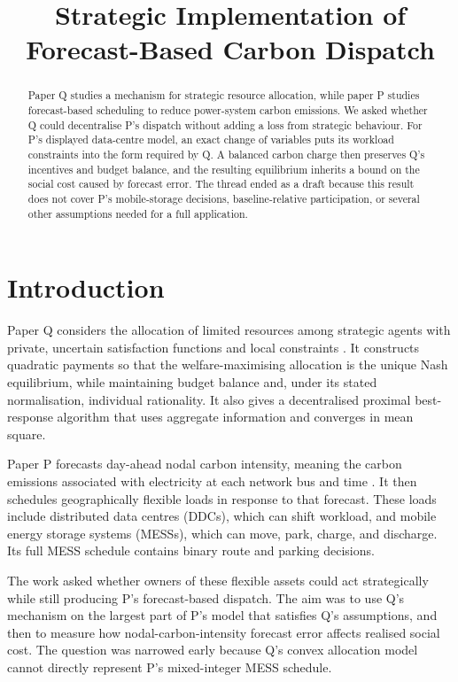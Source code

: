 \documentclass{article}
\title{Strategic Implementation of Forecast-Based Carbon Dispatch}
\author{}
\date{}
\begin{document}
\maketitle

\begin{abstract}
Paper Q studies a mechanism for strategic resource allocation, while paper P studies forecast-based scheduling to reduce power-system carbon emissions.  We asked whether Q could decentralise P's dispatch without adding a loss from strategic behaviour.  For P's displayed data-centre model, an exact change of variables puts its workload constraints into the form required by Q.  A balanced carbon charge then preserves Q's incentives and budget balance, and the resulting equilibrium inherits a bound on the social cost caused by forecast error.  The thread ended as a draft because this result does not cover P's mobile-storage decisions, baseline-relative participation, or several other assumptions needed for a full application.
\end{abstract}

\section{Introduction}

Paper Q considers the allocation of limited resources among strategic agents with private, uncertain satisfaction functions and local constraints \cite{Q}.  It constructs quadratic payments so that the welfare-maximising allocation is the unique Nash equilibrium, while maintaining budget balance and, under its stated normalisation, individual rationality.  It also gives a decentralised proximal best-response algorithm that uses aggregate information and converges in mean square.

Paper P forecasts day-ahead nodal carbon intensity, meaning the carbon emissions associated with electricity at each network bus and time \cite{P}.  It then schedules geographically flexible loads in response to that forecast.  These loads include distributed data centres (DDCs), which can shift workload, and mobile energy storage systems (MESSs), which can move, park, charge, and discharge.  Its full MESS schedule contains binary route and parking decisions.

The work asked whether owners of these flexible assets could act strategically while still producing P's forecast-based dispatch.  The aim was to use Q's mechanism on the largest part of P's model that satisfies Q's assumptions, and then to measure how nodal-carbon-intensity forecast error affects realised social cost.  The question was narrowed early because Q's convex allocation model cannot directly represent P's mixed-integer MESS schedule.
\end{document}

